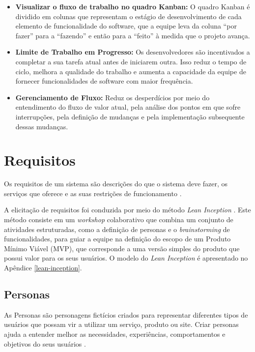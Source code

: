 \begin{itemize}
  \item \textbf{Visualizar o fluxo de trabalho no quadro Kanban:} O quadro Kanban é dividido em colunas que representam o estágio de desenvolvimento de cada elemento de funcionalidade do software, que a equipe leva da coluna “por fazer” para a “fazendo” e então para a “feito” à medida que o projeto avança.
  
  \item \textbf{Limite de Trabalho em Progresso:} Os desenvolvedores são incentivados a completar a sua tarefa atual antes de iniciarem outra. Isso reduz o tempo de ciclo, melhora a qualidade do trabalho e aumenta a capacidade da equipe de fornecer funcionalidades de software com maior frequência.
  
  \item \textbf{Gerenciamento de Fluxo:} Reduz os desperdícios por meio do entendimento do fluxo de valor atual, pela análise dos pontos em que sofre interrupções, pela definição de mudanças e pela implementação subsequente dessas mudanças. 
\end{itemize}

\section[Requisitos]{Requisitos}
\label{requisitos}

Os requisitos de um sistema são descrições do que o sistema deve fazer, os serviços que oferece e as suas restrições de funcionamento \cite{sommerville2011engenharia}.

A elicitação de requisitos foi conduzida por meio do método \textit{Lean Inception} \cite{caroli2018lean}. Este método consiste em um \textit{workshop} colaborativo que combina um conjunto de atividades estruturadas, como a definição de personas e o \textit{brainstorming} de funcionalidades, para guiar a equipe na definição do escopo de um Produto Mínimo Viável (MVP), que corresponde a uma versão simples do produto que possui valor para os seus usuários. O modelo do \textit{Lean Inception} é apresentado no Apêndice \ref{lean-inception}.

\subsection[Personas]{Personas}

As Personas são personagens fictícios criados para representar diferentes tipos de usuários que possam vir a utilizar um serviço, produto ou site. Criar personas ajuda a entender melhor as necessidades, experiências, comportamentos e objetivos do seus usuários \cite{dam2019personas}.

